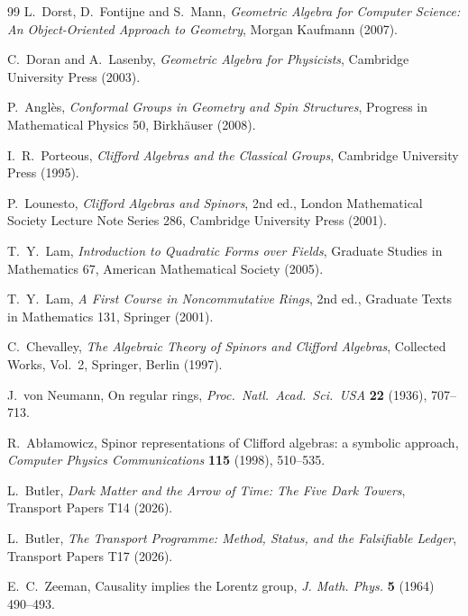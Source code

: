\begin{thebibliography}{99}
L.~Dorst, D.~Fontijne and S.~Mann,
\emph{Geometric Algebra for Computer Science: An Object-Oriented Approach to Geometry},
Morgan Kaufmann (2007).

C.~Doran and A.~Lasenby,
\emph{Geometric Algebra for Physicists},
Cambridge University Press (2003).

P.~Angl\`es,
\emph{Conformal Groups in Geometry and Spin Structures},
Progress in Mathematical Physics 50, Birkh\"auser (2008).

I.~R.~Porteous,
\emph{Clifford Algebras and the Classical Groups},
Cambridge University Press (1995).

P.~Lounesto,
\emph{Clifford Algebras and Spinors}, 2nd ed.,
London Mathematical Society Lecture Note Series 286, Cambridge University Press (2001).

T.~Y.~Lam,
\emph{Introduction to Quadratic Forms over Fields},
Graduate Studies in Mathematics 67, American Mathematical Society (2005).

T.~Y.~Lam,
\emph{A First Course in Noncommutative Rings}, 2nd ed.,
Graduate Texts in Mathematics 131, Springer (2001).

C.~Chevalley,
\emph{The Algebraic Theory of Spinors and Clifford Algebras},
Collected Works, Vol.~2, Springer, Berlin (1997).

J.~von Neumann,
On regular rings,
\emph{Proc.\ Natl.\ Acad.\ Sci.\ USA} \textbf{22} (1936), 707--713.

R.~Ab{\l}amowicz,
Spinor representations of Clifford algebras: a symbolic approach,
\emph{Computer Physics Communications} \textbf{115} (1998), 510--535.

L.~Butler,
\emph{Dark Matter and the Arrow of Time: The Five Dark Towers},
Transport Papers T14 (2026).

L.~Butler,
\emph{The Transport Programme: Method, Status, and the Falsifiable Ledger},
Transport Papers T17 (2026).

E.~C.~Zeeman,
Causality implies the Lorentz group,
\emph{J. Math. Phys.} \textbf{5} (1964) 490--493.

\end{thebibliography}



